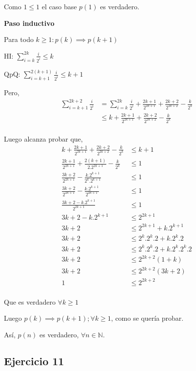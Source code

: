 Como $ 1 \leq 1 $ el caso base $p(1)$ es verdadero.

\textbf{Paso inductivo}

Para todo $k \geq 1: p(k) \implies p(k+1)$

HI: $\sum_{i=k}^{2k}\frac{i}{2^i} \leq k$

QpQ: $ \sum_{i=k+1}^{2(k+1)}\frac{i}{2^i} \leq k+1$

Pero,
\begin{align*}
    \sum_{i=k+1}^{2k+2}\frac{i}{2^i} &= \sum_{i=k}^{2k}\frac{i}{2^i} + \frac{2k+1}{2^{2k+1}}+ \frac{2k+2}{2^{2k+2}} - \frac{k}{2^k} \\
    &\leq k + \frac{2k+1}{2^{2k+1}}+ \frac{2k+2}{2^{2k+2}} - \frac{k}{2^k} \\
\end{align*}

Luego alcanza probar que,
\begin{align*}
    k + \frac{2k+1}{2^{2k+1}}+ \frac{2k+2}{2^{2k+2}} - \frac{k}{2^k} &\leq k+1 \\
    \frac{2k+1}{2^{2k+1}}+ \frac{2(k+1)}{2.2^{2k+1}} - \frac{k}{2^k} &\leq 1 \\
    \frac{3k+2}{2^{2k+1}} - \frac{k.2^{k+1}}{2^k.2^{k+1}} &\leq 1 \\
    \frac{3k+2}{2^{2k+1}} - \frac{k.2^{k+1}}{2^{2k+1}} &\leq 1 \\
    \frac{3k+2 - k.2^{k+1}}{2^{2k+1}} &\leq 1 \\
    3k+2 - k.2^{k+1} &\leq 2^{2k+1} \\
    3k+2 &\leq 2^{2k+1} + k.2^{k+1}\\
    3k+2 &\leq 2^k.2^k.2 + k.2^k.2\\
    3k+2 &\leq 2^k.2^k.2 + k.2^k.2^k.2\\
    3k+2 &\leq 2^{2k+2}(1+k)\\
    3k+2 &\leq 2^{2k+2}(3k+2)\\
    1 &\leq 2^{2k+2}\\
\end{align*}

Que es verdadero $\forall k \geq 1$

Luego $p(k) \implies p(k+1); \forall k \geq 1$, como se quería probar.

Así, $p(n)$ es verdadero, $\forall n \in \mathbb{N}$.

\subsection{Ejercicio 11}

